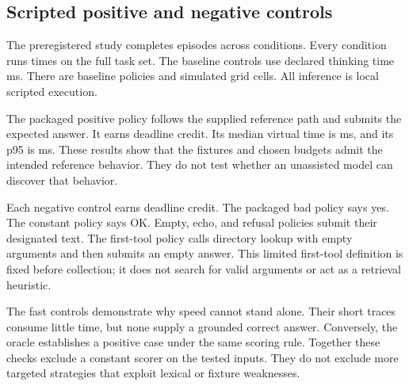\documentclass{article}
\begin{document}
\subsection{Scripted positive and negative controls}
The preregistered study completes \EpisodeCount{} episodes across \ConditionCount{} conditions. Every condition runs \RepeatCount{} times on the full task set. The baseline controls use declared thinking time \BaseThink{} ms. There are \ControlCount{} baseline policies and \GridCount{} simulated grid cells. All inference is local scripted execution.\par
The packaged positive policy follows the supplied reference path and submits the expected answer. It earns \OracleRate{} deadline credit. Its median virtual time is \OracleMedian{} ms, and its p95 is \OracleTail{} ms. These results show that the fixtures and chosen budgets admit the intended reference behavior. They do not test whether an unassisted model can discover that behavior.\par
Each negative control earns \FloorRate{} deadline credit. The packaged bad policy says yes. The constant policy says OK. Empty, echo, and refusal policies submit their designated text. The first-tool policy calls directory lookup with empty arguments and then submits an empty answer. This limited first-tool definition is fixed before collection; it does not search for valid arguments or act as a retrieval heuristic.\par

The fast controls demonstrate why speed cannot stand alone. Their short traces consume little time, but none supply a grounded correct answer. Conversely, the oracle establishes a positive case under the same scoring rule. Together these checks exclude a constant scorer on the tested inputs. They do not exclude more targeted strategies that exploit lexical or fixture weaknesses.\par

\end{document}
